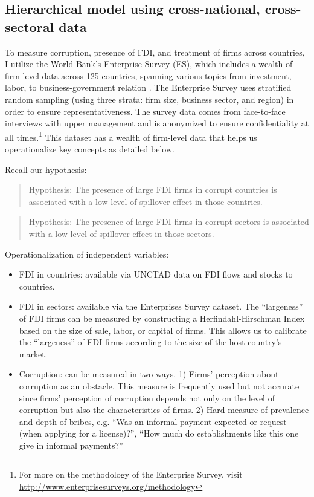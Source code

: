 \subsection{Hierarchical model using cross-national, cross-sectoral data}

To measure corruption, presence of FDI, and treatment of firms across countries, I utilize the World Bank's Enterprise Survey (ES), which includes a wealth of firm-level data across 125 countries, spanning various topics from investment, labor, to business-government relation \citep{WorldBank2015}. The Enterprise Survey uses stratified random sampling (using three strata: firm size, business sector, and region) in order to ensure representativeness. The survey data comes from face-to-face interviews with upper management and is anonymized to ensure confidentiality at all times.\footnote{For more on the methodology of the Enterprise Survey, visit \url{http://www.enterprisesurveys.org/methodology}} This dataset has a wealth of firm-level data that helps us operationalize key concepts as detailed below.

Recall our hypothesis:

\begin{quote}
Hypothesis: The presence of large FDI firms in corrupt countries is associated with a low level of spillover effect in those countries.
\end{quote}

\begin{quote}
Hypothesis: The presence of large FDI firms in corrupt sectors is associated with a low level of spillover effect in those sectors.
\end{quote}

Operationalization of independent variables:
\begin{itemize}
\item FDI in countries: available via UNCTAD data on FDI flows and stocks to countries.

\item FDI in sectors: available via the Enterprises Survey dataset. The ``largeness'' of FDI firms can be measured by constructing a Herfindahl-Hirschman Index based on the size of sale, labor, or capital of firms. This allows us to calibrate the ``largeness'' of FDI firms according to the size of the host country's market.

\item Corruption: can be measured in two ways. 1) Firms' perception about corruption as an obstacle. This measure is frequently used but not accurate since firms' perception of corruption depends not only on the level of corruption but also the characteristics of firms. 2) Hard measure of prevalence and depth of bribes, e.g. ``Was an informal payment expected or request (when applying for a license)?'', ``How much do establishments like this one give in informal payments?'' 
\end{itemize}

